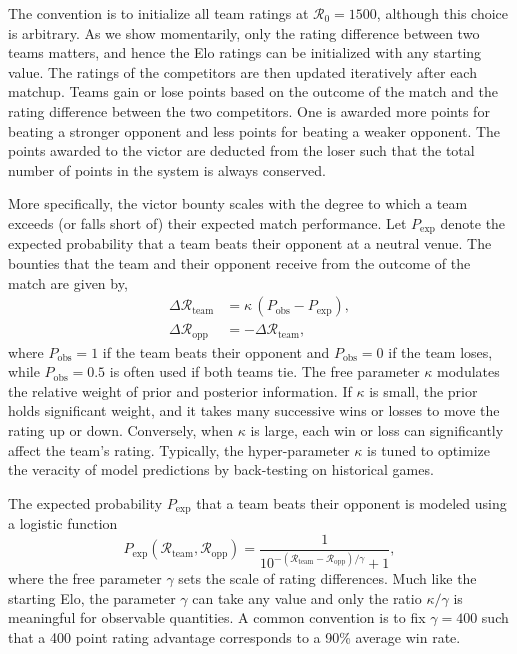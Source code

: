 \documentclass[aps,prc,reprint,amsmath,superscriptaddress]{revtex4-1}
\newcommand{\R}{\mathcal{R}}
\begin{document}
The convention is to initialize all team ratings at ${\R_0 = 1500}$, although this choice is arbitrary.
As we show momentarily, only the rating difference between two teams matters, and hence the Elo ratings can be initialized with any starting value.
The ratings of the competitors are then updated iteratively after each matchup.
Teams gain or lose points based on the outcome of the match and the rating difference between the two competitors.
One is awarded more points for beating a stronger opponent and less points for beating a weaker opponent.
The points awarded to the victor are deducted from the loser such that the total number of points in the system is always conserved.

More specifically, the victor bounty scales with the degree to which a team exceeds (or falls short of) their expected match performance.
Let $P_\text{exp}$ denote the expected probability that a team beats their opponent at a neutral venue.
The bounties that the team and their opponent receive from the outcome of the match are given by,
\begin{align}
  \label{elo}
  \Delta \R_\text{team} &= \kappa \,(P_\text{obs} - P_\text{exp}),\\
  \Delta \R_\text{opp} &= -\Delta \R_\text{team},
\end{align}
where ${P_\text{obs}=1}$ if the team beats their opponent and ${P_\text{obs}=0}$ if the team loses, while $P_\text{obs}=0.5$ is often used if both teams tie.
The free parameter $\kappa$ modulates the relative weight of prior and posterior information. 
If $\kappa$ is small, the prior holds significant weight, and it takes many successive wins or losses to move the rating up or down.
Conversely, when $\kappa$ is large, each win or loss can significantly affect the team's rating.
Typically, the hyper-parameter $\kappa$ is tuned to optimize the veracity of model predictions by back-testing on historical games.

The expected probability $P_\text{exp}$ that a team beats their opponent is modeled using a logistic function
\begin{equation}
  \label{win_prob}
  P_\text{exp}(\R_\text{team}, \R_\text{opp}) = \frac{1}{10^{-(\R_\text{team} - \R_\text{opp})/\gamma} +1},
\end{equation}
where the free parameter $\gamma$ sets the scale of rating differences.
Much like the starting Elo, the parameter $\gamma$ can take any value and only the ratio $\kappa/\gamma$ is meaningful for observable quantities.
A common convention is to fix $\gamma=400$ such that a 400 point rating advantage corresponds to a 90\% average win rate.
\end{document}
